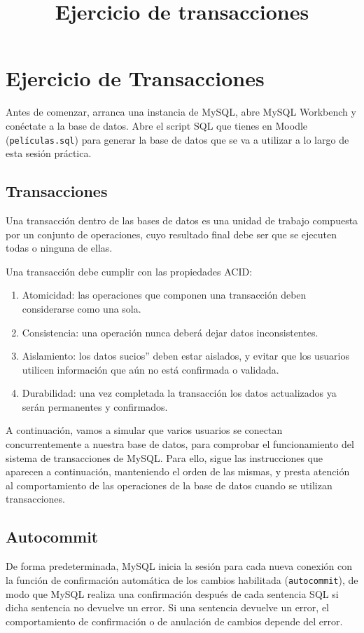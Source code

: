 \documentclass{db-practice}
\begin{document}
\title{Ejercicio de transacciones}

\section*{Ejercicio de Transacciones}

Antes de comenzar, arranca una instancia de MySQL, abre MySQL Workbench y conéctate a la base de datos. Abre el script SQL que tienes en Moodle (\texttt{películas.sql}) para generar la base de datos que se va a utilizar a lo largo de esta sesión práctica.

\subsection*{Transacciones}

Una transacción dentro de las bases de datos es una unidad de trabajo compuesta por un conjunto de operaciones, cuyo resultado final debe ser que se ejecuten todas o ninguna de ellas.

Una transacción debe cumplir con las propiedades ACID:

\begin{enumerate}
    \item Atomicidad: las operaciones que componen una transacción deben considerarse como una sola.
    \item Consistencia: una operación nunca deberá dejar datos inconsistentes.
    \item Aislamiento: los datos sucios'' deben estar aislados, y evitar que los usuarios utilicen información que aún no está confirmada o validada.
    \item Durabilidad: una vez completada la transacción los datos actualizados ya serán permanentes y confirmados.
\end{enumerate}

A continuación, vamos a simular que varios usuarios se conectan concurrentemente a nuestra base de datos, para comprobar el funcionamiento del sistema de transacciones de MySQL. Para ello, sigue las instrucciones que aparecen a continuación, manteniendo el orden de las mismas, y presta atención al comportamiento de las operaciones de la base de datos cuando se utilizan transacciones.

\subsection*{Autocommit}

De forma predeterminada, MySQL inicia la sesión para cada nueva conexión con la función de confirmación automática de los cambios habilitada (\texttt{autocommit}), de modo que MySQL realiza una confirmación después de cada sentencia SQL si dicha sentencia no devuelve un error. Si una sentencia devuelve un error, el comportamiento de confirmación o de anulación de cambios depende del error.
\end{document}
